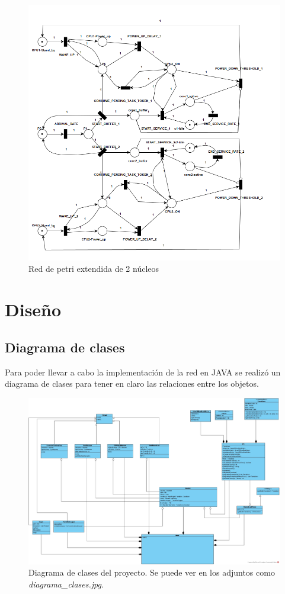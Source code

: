 \documentclass[a4paper,11pt]{article}
\begin{document}
    \begin{figure}[H]
        \centering
        \includegraphics[width=1\textwidth]{images/red_final.png}
        \caption{Red de petri extendida de 2 núcleos}
        \label{fig:red_final}
    \end{figure}
    
    \section{Diseño}
    \subsection{Diagrama de clases}
    Para poder llevar a cabo la implementación de la red
    en JAVA se realizó un diagrama de clases para tener en claro
    las relaciones entre los objetos.
    \begin{figure}[H]
        \centering
        \includegraphics[width=1\textwidth]{images/diagrama_clases.jpg}
        \caption{Diagrama de clases del proyecto. Se puede ver en los adjuntos como \textit{diagrama\_clases.jpg}.}
        \label{fig:diag_clases}
    \end{figure}
    
\end{document}
